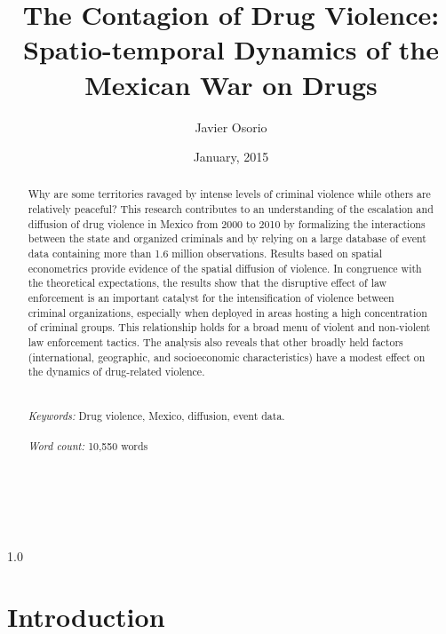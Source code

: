 \documentclass[12pt,letterpaper]{article}
\title{The Contagion of Drug Violence: Spatio-temporal Dynamics of the Mexican War on Drugs}
\author{Javier Osorio} %
\affil{John Jay College of Criminal Justice\\ City University of New York}
\date{January, 2015}
\begin{document}
\maketitle


\mbox{}\\
\begin{spacing}{1.0}
\begin{abstract}
\noindent Why are some territories ravaged by intense levels of criminal violence while others are relatively peaceful? This research contributes to an understanding of the escalation and diffusion of drug violence in Mexico from 2000 to 2010 by formalizing the interactions between the state and organized criminals and by relying on a large database of event data containing more than 1.6 million observations. Results based on spatial econometrics provide evidence of the spatial diffusion of violence. In congruence with the theoretical expectations, the results show that the disruptive effect of law enforcement is an important catalyst for the intensification of violence between criminal organizations, especially when deployed in areas hosting a high concentration of criminal groups. This relationship holds for a broad menu of violent and non-violent law enforcement tactics. The analysis also reveals that other broadly held factors (international, geographic, and socioeconomic characteristics) have a modest effect on the dynamics of drug-related violence. \\ \\
\mbox{}\\
\emph{Keywords:} Drug violence, Mexico, diffusion, event data.  \\ \\
\emph{Word count:} 10,550 words \\ \\
\end{abstract}
\end{spacing}


\newpage

\section*{Introduction}
\end{document}
